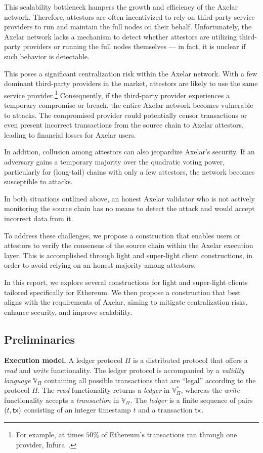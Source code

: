 This scalability bottleneck hampers the growth and efficiency of the Axelar network. Therefore, attestors are often incentivized to rely on third-party service providers to run and maintain the full nodes on their behalf. Unfortunately, the Axelar network lacks a mechanism to detect whether attestors are utilizing third-party providers or running the full nodes themselves --- in fact, it is unclear if such behavior is detectable.

This poses a significant centralization risk within the Axelar network. With a few dominant third-party providers in the market, attestors are likely to use the same service provider.\footnote{For example, at times $50$\% of Ethereum's transactions ran through one provider, Infura~\cite{infura}.} Consequently, if the third-party provider experiences a temporary compromise or breach, the entire Axelar network becomes vulnerable to attacks. The compromised provider could potentially censor transactions or even present incorrect transactions from the source chain to Axelar attestors, leading to financial losses for Axelar users.

In addition, collusion among attestors can also jeopardize Axelar's security. If an adversary gains a temporary majority over the quadratic voting power, particularly for (long-tail) chains with only a few attestors, the network becomes susceptible to attacks. 

In both situations outlined above, an honest Axelar validator who is not actively monitoring the source chain has no means to detect the attack and would accept incorrect data from it.

To address these challenges, we propose a construction that enables users or attestors to verify the consensus of the source chain within the Axelar execution layer. This is accomplished through light and super-light client constructions, in order to avoid relying on an honest majority among attestors.

In this report, we explore several constructions for light and super-light clients tailored specifically for Ethereum. We then propose a construction that best aligns with the requirements of Axelar, aiming to mitigate centralization risks, enhance security, and improve scalability.

\subsection{Preliminaries}
\noindent
\textbf{Execution model.}
A ledger protocol $\Pi$ is a distributed protocol that offers
a \emph{read} and \emph{write} functionality.
The ledger protocol is accompanied by a \emph{validity language}
$\mathbb{V}_{\Pi}$ containing all possible transactions that are ``legal''
according to the protocol $\Pi$.
The
\emph{read} functionality returns a \emph{ledger} in $\mathbb{V}_{\Pi}^*$,
whereas the \emph{write} functionality accepts a \emph{transaction} in $\mathbb{V}_\Pi$.
The \emph{ledger} is a finite sequence of pairs $(t, \textsf{tx})$ consisting
of an integer timestamp $t$ and a transaction $\textsf{tx}$.

